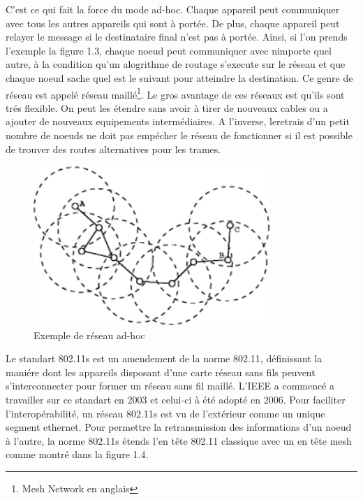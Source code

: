 C'est ce qui fait la force du mode ad-hoc. Chaque appareil peut communiquer avec tous les autres appareils qui sont à portée.
De plus, chaque appareil peut relayer le message si le destinataire final n'est pas à portée. Ainsi, si l'on prends l'exemple
la figure 1.3, chaque noeud peut communiquer avec nimporte quel autre, à la condition qu'un alogrithme de routage s'execute
sur le réseau et que chaque noeud sache quel est le suivant pour atteindre la destination. Ce genre de réseau est appelé réseau
maillé\footnote{Mesh Network en anglais}. Le gros avantage de ces réseaux est qu'ils sont trés flexible. On peut les étendre sans
avoir à tirer de nouveaux cables ou a ajouter de nouveaux equipements intermédiaires\cite{MNintro}. A l'inverse, leretrais d'un
petit nombre de noeuds ne doit pas empécher le réseau de fonctionner si il est possible de trouver des routes alternatives pour
les trames.
\begin{figure}
   \centering
   \includegraphics[width=0.8\textwidth,natwidth=488,natheight=513]{images/ad_hoc.png}
   \caption{Exemple de réseau ad-hoc}
\end{figure}

Le standart 802.11s est un amendement de la norme 802.11, définissant la maniére dont les appareils disposant d'une carte réseau
sans fils peuvent s'interconnecter pour former un réseau sans fil maillé. L'IEEE a commencé a travailler sur ce standart en 
2003 et celui-ci à été adopté en 2006. Pour faciliter l'interopérabilité, un réseau 802.11s est vu de l'extérieur comme un
unique segment ethernet. Pour permettre la retransmission des informations d'un noeud à l'autre, la norme 802.11s
étends l'en tête 802.11 classique avec un en tête mesh comme montré dans la figure 1.4\cite{MNfunc}.

